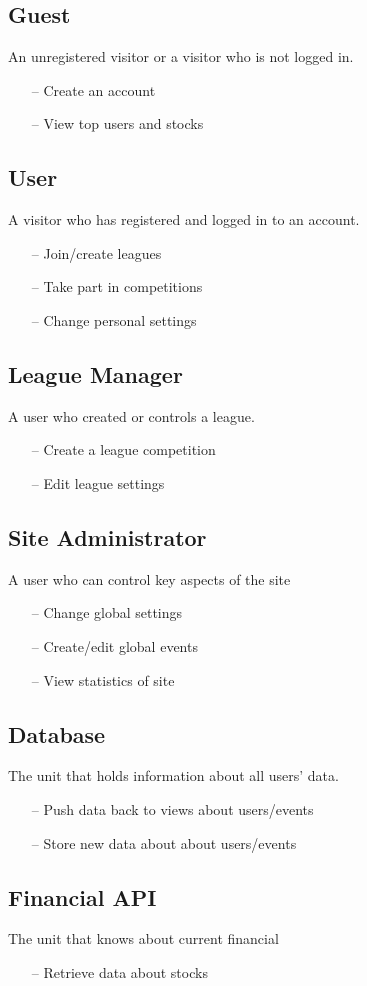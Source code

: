\subsection{Guest}
An unregistered visitor or a visitor who is not logged in.
\begin{itemize}
\item[--] Create an account
\item[--] View top users and stocks
\end{itemize}
\subsection{User}
A visitor who has registered and logged in to an account.
\begin{itemize}
\item[--] Join/create leagues
\item[--] Take part in competitions
\item[--] Change personal settings
\end{itemize}
\subsection{League Manager}
A user who created or controls a league.
\begin{itemize}
\item[--] Create a league competition
\item[--] Edit league settings
\end{itemize}
\subsection{Site Administrator}
A user who can control key aspects of the site
\begin{itemize}
\item[--] Change global settings
\item[--] Create/edit global events
\item[--] View statistics of site
\end{itemize}
\subsection{Database}
The unit that holds information about all users' data.
\begin{itemize}
\item[--] Push data back to views about users/events
\item[--] Store new data about about users/events
\end{itemize}
\subsection{Financial API}
The unit that knows about current financial 
\begin{itemize}
\item[--] Retrieve data about stocks
\end{itemize}
